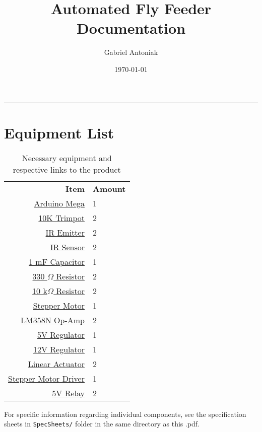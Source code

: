 \documentclass[12pt]{article}
\title{Automated Fly Feeder Documentation}
\author{Gabriel Antoniak}
\date{\today}
\newcommand{\divider}{\vspace*{-4mm} \rule{\linewidth}{1pt} \vspace{-4pt} }
\begin{document}
\maketitle
\divider

\section{Equipment List}
\renewcommand{\arraystretch}{1.2}
\begin{table}[H]
	\centering
	\begin{tabular}{ r | l }
		\textbf{Item}  & \textbf{Amount} \\ \cline{1-2}
		\href{https://store.arduino.cc/usa/arduino-mega-2560-rev3}{Arduino Mega}   &  1\\
		\href{https://www.sparkfun.com/products/9806}{10K Trimpot}    &  2\\
		\href{https://www.sparkfun.com/products/241}{IR Emitter}     &  2\\
		\href{https://www.sparkfun.com/products/241}{IR Sensor}      &  2\\
		\href{https://www.sparkfun.com/products/8982}{1 mF Capacitor} &  1\\
		\href{https://www.sparkfun.com/products/14490}{330 $\Omega$ Resistor} &  2\\ 
		\href{https://www.sparkfun.com/products/14491}{10 k$\Omega$ Resistor} &  2\\
		\href{https://www.pololu.com/product/1200}{Stepper Motor} & 1\\
		\href{https://www.sparkfun.com/products/9456}{LM358N Op-Amp} & 2\\
		\href{https://www.pololu.com/product/2858}{5V Regulator} & 1\\
		\href{https://www.pololu.com/product/2855}{12V Regulator} & 1\\
		\href{https://www.actuonix.com/L12-I-Micro-Linear-Actuator-Internal-Controller-p/l12-i.htm}{Linear Actuator} & 2\\
		\href{https://www.circuitspecialists.com/cw230.html}{Stepper Motor Driver} & 1\\
		\href{https://www.pololu.com/product/2485}{5V Relay}  & 2\\ \bottomrule
	\end{tabular}
	\caption{Necessary equipment and respective links to the product}
	\label{tbl:equipment}
\end{table}

For specific information regarding individual components, see the specification sheets in \texttt{SpecSheets/} folder in the same directory as this .pdf.
\end{document}
